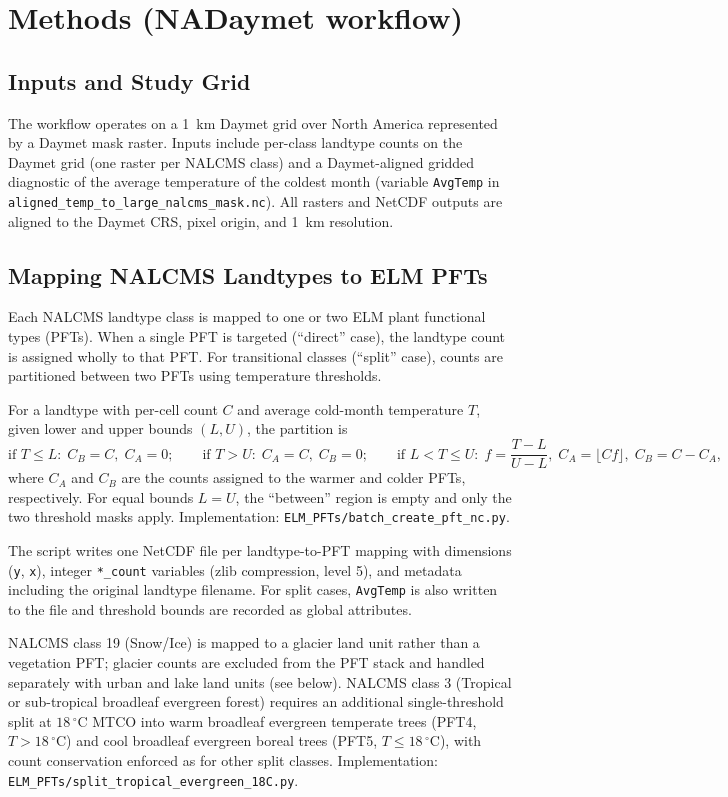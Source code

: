 \section{Methods (NADaymet workflow)}

\subsection{Inputs and Study Grid}
The workflow operates on a 1~km Daymet grid over North America represented by a Daymet mask raster. Inputs include per-class landtype counts on the Daymet grid (one raster per NALCMS class) and a Daymet-aligned gridded diagnostic of the average temperature of the coldest month (variable \texttt{AvgTemp} in \texttt{aligned\_temp\_to\_large\_nalcms\_mask.nc}). All rasters and NetCDF outputs are aligned to the Daymet CRS, pixel origin, and 1~km resolution.

\subsection{Mapping NALCMS Landtypes to ELM PFTs}
Each NALCMS landtype class is mapped to one or two ELM plant functional types (PFTs). When a single PFT is targeted (``direct'' case), the landtype count is assigned wholly to that PFT. For transitional classes (``split'' case), counts are partitioned between two PFTs using temperature thresholds.

For a landtype with per-cell count \(C\) and average cold-month temperature \(T\), given lower and upper bounds \((L, U)\), the partition is
\[
  \text{if } T \le L:\; C_B = C,\; C_A = 0;\qquad
  \text{if } T > U:\; C_A = C,\; C_B = 0;\qquad
  \text{if } L < T \le U:\; f = \frac{T - L}{U - L},\; C_A = \lfloor C f \rfloor,\; C_B = C - C_A,
\]
where \(C_A\) and \(C_B\) are the counts assigned to the warmer and colder PFTs, respectively. For equal bounds \(L{=}U\), the ``between'' region is empty and only the two threshold masks apply. Implementation: \texttt{ELM\_PFTs/batch\_create\_pft\_nc.py}.

The script writes one NetCDF file per landtype-to-PFT mapping with dimensions (\texttt{y}, \texttt{x}), integer \texttt{*_count} variables (zlib compression, level 5), and metadata including the original landtype filename. For split cases, \texttt{AvgTemp} is also written to the file and threshold bounds are recorded as global attributes.

NALCMS class 19 (Snow/Ice) is mapped to a glacier land unit rather than a vegetation PFT; glacier counts are excluded from the PFT stack and handled separately with urban and lake land units (see below). NALCMS class 3 (Tropical or sub-tropical broadleaf evergreen forest) requires an additional single-threshold split at \(18\,^{\circ}\mathrm{C}\) MTCO into warm broadleaf evergreen temperate trees (PFT4, \(T > 18\,^{\circ}\mathrm{C}\)) and cool broadleaf evergreen boreal trees (PFT5, \(T \le 18\,^{\circ}\mathrm{C}\)), with count conservation enforced as for other split classes. Implementation: \texttt{ELM\_PFTs/split\_tropical\_evergreen\_18C.py}.

